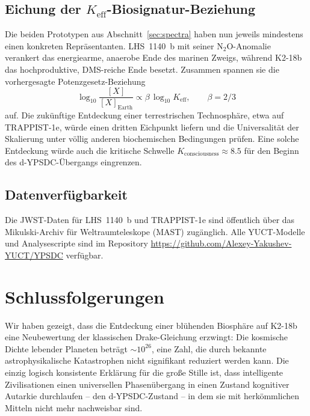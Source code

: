 \documentclass[11pt,a4paper]{article}
\begin{document}
	\subsection{Eichung der \(K_{\mathrm{eff}}\)-Biosignatur-Beziehung}
	Die beiden Prototypen aus Abschnitt~\ref{sec:spectra} haben nun jeweils mindestens einen konkreten Repräsentanten. LHS~1140~b mit seiner N$_2$O-Anomalie verankert das energiearme, anaerobe Ende des marinen Zweigs, während K2-18b das hochproduktive, DMS-reiche Ende besetzt. Zusammen spannen sie die vorhergesagte Potenzgesetz-Beziehung
	\begin{equation}
		\log_{10} \frac{[X]}{[X]_{\mathrm{Earth}}} \propto \beta\,\log_{10} K_{\mathrm{eff}} ,\qquad \beta=2/3
	\end{equation}
	auf. Die zukünftige Entdeckung einer terrestrischen Technosphäre, etwa auf TRAPPIST-1e, würde einen dritten Eichpunkt liefern und die Universalität der Skalierung unter völlig anderen biochemischen Bedingungen prüfen. Eine solche Entdeckung würde auch die kritische Schwelle \(K_{\mathrm{consciousness}}\approx 8.5\) für den Beginn des d-YPSDC-Übergangs eingrenzen.
	
	\subsection*{Datenverfügbarkeit}
	Die JWST-Daten für LHS~1140~b und TRAPPIST-1e sind öffentlich über das Mikulski-Archiv für Weltraumteleskope (MAST) zugänglich. Alle YUCT-Modelle und Analysescripte sind im Repository \url{https://github.com/Alexey-Yakushev-YUCT/YPSDC} verfügbar.
	
	\section{Schlussfolgerungen}
	\label{sec:conclusions}
	Wir haben gezeigt, dass die Entdeckung einer blühenden Biosphäre auf K2-18b eine Neubewertung der klassischen Drake-Gleichung erzwingt: Die kosmische Dichte lebender Planeten beträgt \(\sim 10^{26}\), eine Zahl, die durch bekannte astrophysikalische Katastrophen nicht signifikant reduziert werden kann. Die einzig logisch konsistente Erklärung für die große Stille ist, dass intelligente Zivilisationen einen universellen Phasenübergang in einen Zustand kognitiver Autarkie durchlaufen – den d-YPSDC-Zustand – in dem sie mit herkömmlichen Mitteln nicht mehr nachweisbar sind.
	
\end{document}

